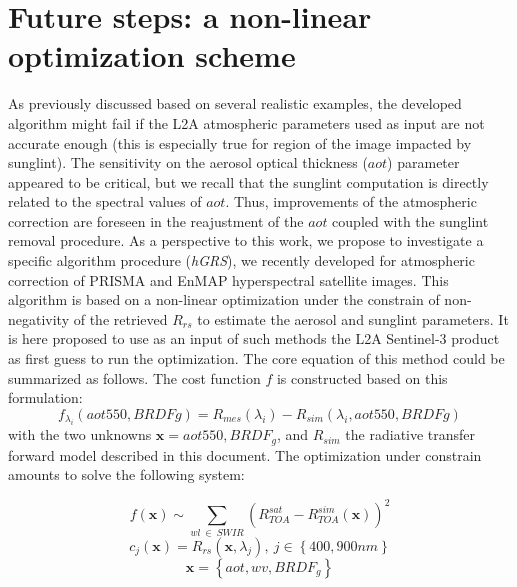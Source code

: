 \documentclass{article}
\begin{document}
\section{Future steps: a non-linear optimization scheme}\label{sec:perspectives}
As previously discussed based on several realistic examples, the developed algorithm might fail if the L2A atmospheric parameters used as input are not accurate enough (this is especially true for region of the image impacted by sunglint). The sensitivity on the aerosol optical thickness ($aot$) parameter appeared to be critical, but we recall that the sunglint computation is directly related to the spectral values of $aot$. Thus,  improvements of the atmospheric correction are foreseen in the reajustment of the $aot$ coupled with the sunglint removal procedure. As a perspective to this work, we propose to investigate a specific algorithm procedure (\textit{hGRS}), we recently developed for atmospheric correction of PRISMA and EnMAP hyperspectral satellite images. This algorithm is based on a non-linear optimization under the constrain of non-negativity of the retrieved $R_{rs}$ to estimate the aerosol and sunglint parameters. It is here proposed to use as an input of such methods the L2A Sentinel-3 product as first guess to run the optimization. The core equation of this method could be summarized as follows. The cost function $f$ is constructed based on this formulation:
\begin{equation}
      f_{\lambda_i}(aot550,BRDFg)  = R_{mes}(\lambda_i) - R_{sim}(\lambda_i, aot550, BRDFg)
\label{eq:placeholder}
\end{equation}
with the two unknowns $\mathbf{x}={aot550, BRDF_g}$, and $R_{sim}$ the radiative transfer forward model described in this document. The optimization under constrain amounts to solve the following system:


\begin{equation}
f\left( \textbf{x} \right)\sim \sum_{wl\ \in\ SWIR}^{}\left(R^{sat}_{TOA}-R^{sim}_{TOA}\left( \textbf{x} \right)  \right)^{2} 
\label{eq:placeholder}
\end{equation}
\begin{equation}
c_{j}\left( \textbf{x} \right)=R_{rs}\left(\textbf{x} ,\lambda_{j} \right),\ j\in \left\{ 400,900 nm \right\}
\label{eq:placeholder}
\end{equation}
\begin{equation}
\textbf{x}=\left\{ aot, wv,BRDF_{g} \right\}
\label{eq:placeholder}
\end{equation}
\end{document}
